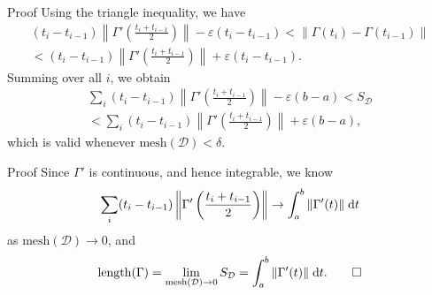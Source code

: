 \begin{frame}{Proof}
    Using the triangle inequality, we have
  \begin{multline*}
    (t_i - t_{i - 1}) \left\|\Gamma'\left(\frac{t_i + t_{i - 1}}{2}\right)\right\| - \varepsilon(t_i - t_{i - 1}) < \|\Gamma(t_i) - \Gamma(t_{i - 1})\| \\
    < (t_i - t_{i - 1}) \left\|\Gamma'\left(\frac{t_i + t_{i - 1}}{2}\right)\right\| + \varepsilon(t_i - t_{i - 1}).
  \end{multline*}
  Summing over all $i$, we obtain
  \begin{multline*}
    \sum_i (t_i - t_{i - 1}) \left\|\Gamma'\left(\frac{t_i + t_{i - 1}}{2}\right)\right\| - \varepsilon(b - a) < S_{\mathcal{D}}\\
    < \sum_i (t_i - t_{i - 1}) \left\|\Gamma'\left(\frac{t_i + t_{i - 1}}{2}\right)\right\| + \varepsilon(b - a),
  \end{multline*}
  which is valid whenever $\mathrm{mesh}(\mathcal{D}) < \delta$.
\end{frame}

\begin{frame}{Proof}
    Since $\Gamma'$ is continuous, and hence integrable, we know
  \[
    \sum_i (t_i - t_{i - 1}) \left\|\Gamma'\left(\frac{t_i + t_{i - 1}}{2}\right)\right\| \to \int_a^b \|\Gamma'(t)\|\;\mathrm{d} t
  \]
  as $\mathrm{mesh}(\mathcal{D}) \to 0$, and
  \[
    \operatorname{length}(\Gamma) = \lim_{\mathrm{mesh}(\mathcal{D}) \to 0} S_\mathcal{D} = \int_a^b \|\Gamma'(t)\|\;\mathrm{d} t.\qedhere
  \]
\end{frame}